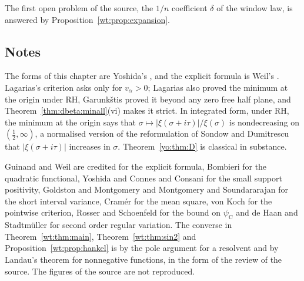 The first open problem of the source, the $1/n$ coefficient $\delta$ of the window law, is answered by Proposition~\ref{wt:prop:expansion}.

\subsection*{Notes}

The forms of this chapter are Yoshida's \cite{Yoshida92}, and the explicit formula is Weil's \cite{Weil52}. Lagarias's criterion \cite{Lagarias} asks only for $v_\alpha>0$; Lagarias also proved the minimum at the origin under RH, Garunk\v{s}tis \cite{Garunkstis02} proved it beyond any zero free half plane, and Theorem~\ref{thm:dbeta:minall}(vi) makes it strict. In integrated form, under RH, the minimum at the origin says that $\sigma\mapsto|\xi(\sigma+i\tau)|/\xi(\sigma)$ is nondecreasing on $(\frac12,\infty)$, a normalised version of the reformulation of Sondow and Dumitrescu \cite{SD10} that $|\xi(\sigma+i\tau)|$ increases in $\sigma$. Theorem~\ref{yo:thm:D} is classical in substance.

Guinand and Weil are credited for the explicit formula, Bombieri for the quadratic functional, Yoshida and Connes and Consani for the small support positivity, Goldston and Montgomery and Montgomery and Soundararajan for the short interval variance, Cram\'er for the mean square, von Koch for the pointwise criterion, Rosser and Schoenfeld for the bound on $\psi_{\mathrm C}$ and de Haan and Stadtm\"uller for second order regular variation. The converse in Theorem~\ref{wt:thm:main}, Theorem~\ref{wt:thm:sin2} and Proposition~\ref{wt:prop:hankel} is by the pole argument for a resolvent and by Landau's theorem for nonnegative functions, in the form of the review of the source. The figures of the source are not reproduced.
